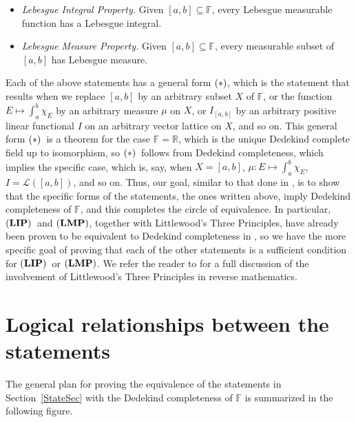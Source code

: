 \documentclass[10pt,a4paper]{amsart}
\def\Star{\ensuremath{{\bf(*)}}}
\def\iLTP{\ensuremath{{\bf(LP1)}}}
\def\R{\mathbb{R}}
\def\F{\mathbb{F}}
\def\P{\mathbb{P}}
\def\LIP{\ensuremath{{\bf(LIP)}}}
\def\LMP{\ensuremath{{\bf(LMP)}}}
\def\lbrak{\left[}
\def\rbrak{\right]}
\def\abClosed{\lbrak a,b\rbrak}
\def\stepLatt{\mathcal{L}}
\def\elemLatt{\stepLatt(\abClosed)}
\def\elemI{I_{\abClosed}}
\def\sub{\subseteq}
\begin{document}
\begin{itemize}
    \item[\LIP]\emph{Lebesgue Integral Property.} Given $\abClosed\sub\F$, every Lebesgue measurable function has a Lebesgue integral.

        \item[\LMP]\emph{Lebesgue Measure Property.} Given $\abClosed\sub\F$, every  measurable subset of $\abClosed$ has Lebesgue measure.

\end{itemize}

Each of the above statements has a general form \Star, which is the statement that results when we replace $\abClosed$ by an arbitrary subset $X$ of $\F$, or the function $E\mapsto\int_a^b\chi_E$ by an arbitrary measure $\mu$ on $X$, or $\elemI$ by an arbitrary positive linear functional $I$ on an arbitrary vector lattice on $X$, and so on. This general form \Star\  is a theorem for the case $\F=\R$, which is the unique Dedekind complete field up to isomorphism, so \Star\  follows from Dedekind completeness, which implies the specific case, which is, say, when $X=\abClosed$, $\mu:E\mapsto\int_a^b\chi_E$, $I=\elemLatt$, and so on. Thus, our goal, similar to that done in \cite[pp.~116--117]{can24}, is to show that the specific forms of the statements, the ones written above, imply Dedekind completeness of $\F$, and this completes the circle of equivalence. In particular, \LIP\  and \LMP, together with Littlewood's Three Principles, have already been proven to be equivalent to Dedekind completeness in \cite{can24}, so we have the more specific goal of proving that each of the other statements is a sufficient condition for \LIP\  or \LMP. We refer the reader to \cite{can24} for a full discussion of the involvement of Littlewood's Three Principles in reverse mathematics. 

\section{Logical relationships between the statements}

The general plan for proving the equivalence of the statements in Section~\ref{StateSec} with the Dedekind completeness of $\F$ is summarized in the following figure.
\end{document}
